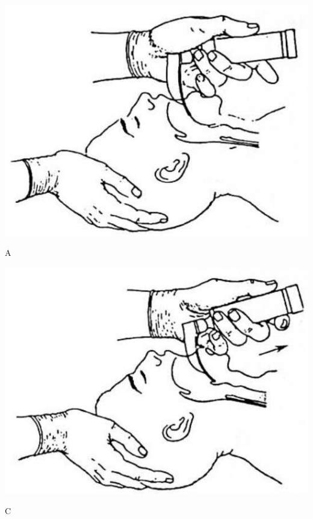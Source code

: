 \documentclass[10pt]{article}
\begin{document}
\begin{center}
\includegraphics[max width=\textwidth]{2024_07_09_002a177993bd97d1d6d7g-090(3)}
\end{center}

A

\begin{center}
\includegraphics[max width=\textwidth]{2024_07_09_002a177993bd97d1d6d7g-090(2)}
\end{center}

C
\end{document}
